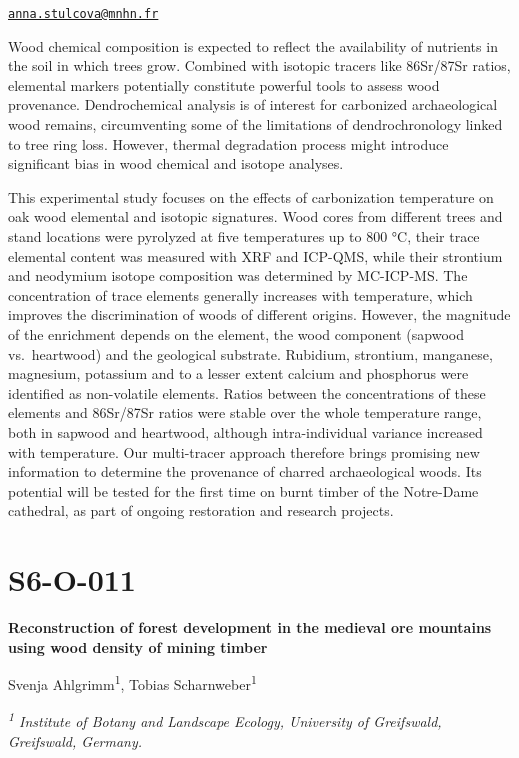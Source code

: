 \documentclass[
]{book}
\begin{document}
\href{mailto:anna.stulcova@mnhn.fr}{\nolinkurl{anna.stulcova@mnhn.fr}}

Wood chemical composition is expected to reflect the availability of nutrients in the soil in which trees grow. Combined with isotopic tracers like 86Sr/87Sr ratios, elemental markers potentially constitute powerful tools to assess wood provenance. Dendrochemical analysis is of interest for carbonized archaeological wood remains, circumventing some of the limitations of dendrochronology linked to tree ring loss. However, thermal degradation process might introduce significant bias in wood chemical and isotope analyses.

This experimental study focuses on the effects of carbonization temperature on oak wood elemental and isotopic signatures. Wood cores from different trees and stand locations were pyrolyzed at five temperatures up to 800 °C, their trace elemental content was measured with XRF and ICP-QMS, while their strontium and neodymium isotope composition was determined by MC-ICP-MS. The concentration of trace elements generally increases with temperature, which improves the discrimination of woods of different origins. However, the magnitude of the enrichment depends on the element, the wood component (sapwood vs.~heartwood) and the geological substrate. Rubidium, strontium, manganese, magnesium, potassium and to a lesser extent calcium and phosphorus were identified as non-volatile elements. Ratios between the concentrations of these elements and 86Sr/87Sr ratios were stable over the whole temperature range, both in sapwood and heartwood, although intra-individual variance increased with temperature. Our multi-tracer approach therefore brings promising new information to determine the provenance of charred archaeological woods. Its potential will be tested for the first time on burnt timber of the Notre-Dame cathedral, as part of ongoing restoration and research projects.

\hypertarget{s6-o-011}{%
\section*{S6-O-011}\label{s6-o-011}}

\textbf{Reconstruction of forest development in the medieval ore mountains using wood density of mining timber}

Svenja Ahlgrimm\textsuperscript{1}, Tobias Scharnweber\textsuperscript{1}

\emph{\textsuperscript{1} Institute of Botany and Landscape Ecology, University of Greifswald, Greifswald, Germany.}
\end{document}
